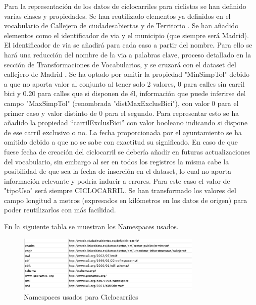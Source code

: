 Para la representación de los datos de ciclocarriles para ciclistas se han definido varias clases y propiedades. Se han reutilizado elementos ya definidos en el vocabulario de Callejero de ciudadesabiertas \cite{ciudadesbiertas_callejero} y de Territorio \cite{datoabiertos_municipio}.\newline
Se han añadido elementos como el identificador de via y el municipio (que siempre será Madrid).
El identificador de via se añadirá para cada caso a partir del nombre. Para ello se hará una reducción del nombre de la via a palabras clave, proceso detallado en la sección de Transformaciones de Vocabularios, y se cruzará con el dataset del callejero de Madrid \cite{datosmadrid_callejero}.\newline
Se ha optado por omitir la propiedad "MinSimpTol" debido a que no aporta valor al conjunto al tener solo 2 valores, 0 para calles sin carril bici y 0.20 para calles que si disponen de él, información que puede inferirse del campo "MaxSimpTol" (renombrada "distMaxExclusBici"), con valor 0 para el primer caso y valor distinto de 0 para el segundo. Para representar esto se ha añadido la propiedad “carrilExclusBici” con valor booleano indicando si dispone de ese carril exclusivo o no.\newline
La fecha proporcionada por el ayuntamiento se ha omitido debido a que no se sabe con exactitud su significado. En caso de que fuese fecha de creación del ciclocarril se debería añadir en futuras actualizaciones del vocabulario, sin embargo al ser en todos los registros la misma cabe la posibilidad de que sea la fecha de inserción en el dataset, lo cual no aporta información relevante y podría inducir a errores.\newline
Para este caso el valor de "tipoUso" será siempre CICLOCARRIL.\newline
Se han transformado los valores del campo longitud a metros (expresados en kilómetros en los datos de origen) para poder reutilizarlos con más facilidad.


\newpage
En la siguiente tabla se muestran los Namespaces usados.

\begin{figure}[h]
	\centering
		\includegraphics[angle=0, width=0.8\textwidth]{images/tablaIRIsCiclocarril.png}  
	\caption{Namespaces usados para Ciclocarriles}
\end{figure}




